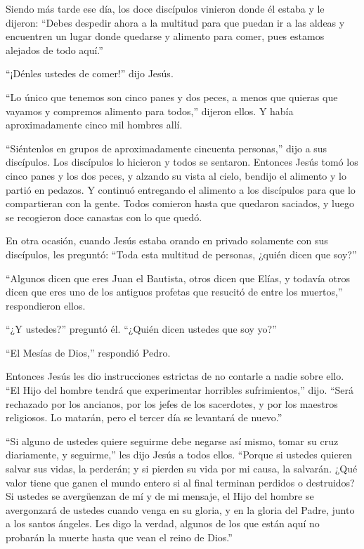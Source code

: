  Siendo más tarde ese día, los doce discípulos vinieron
donde él estaba y le dijeron: ``Debes despedir ahora a la multitud para
que puedan ir a las aldeas y encuentren un lugar donde quedarse y
alimento para comer, pues estamos alejados de todo aquí.''

 ``¡Dénles ustedes de comer!'' dijo Jesús.

``Lo único que tenemos son cinco panes y dos peces, a menos que quieras
que vayamos y compremos alimento para todos,'' dijeron ellos.
 Y había aproximadamente cinco mil hombres allí.

``Siéntenlos en grupos de aproximadamente cincuenta personas,'' dijo a
sus discípulos.  Los discípulos lo hicieron y todos se
sentaron.  Entonces Jesús tomó los cinco panes y los dos
peces, y alzando su vista al cielo, bendijo el alimento y lo partió en
pedazos. Y continuó entregando el alimento a los discípulos para que lo
compartieran con la gente.  Todos comieron hasta que
quedaron saciados, y luego se recogieron doce canastas con lo que quedó.

 En otra ocasión, cuando Jesús estaba orando en privado
solamente con sus discípulos, les preguntó: ``Toda esta multitud de
personas, ¿quién dicen que soy?''

 ``Algunos dicen que eres Juan el Bautista, otros dicen que
Elías, y todavía otros dicen que eres uno de los antiguos profetas que
resucitó de entre los muertos,'' respondieron ellos.

 ``¿Y ustedes?'' preguntó él. ``¿Quién dicen ustedes que
soy yo?''

``El Mesías de Dios,'' respondió Pedro.

 Entonces Jesús les dio instrucciones estrictas de no
contarle a nadie sobre ello.  ``El Hijo del hombre tendrá
que experimentar horribles sufrimientos,'' dijo. ``Será rechazado por
los ancianos, por los jefes de los sacerdotes, y por los maestros
religiosos. Lo matarán, pero el tercer día se levantará de nuevo.''

 ``Si alguno de ustedes quiere seguirme debe negarse así
mismo, tomar su cruz diariamente, y seguirme,'' les dijo Jesús a todos
ellos.  ``Porque si ustedes quieren salvar sus vidas, la
perderán; y si pierden su vida por mi causa, la salvarán. 
¿Qué valor tiene que ganen el mundo entero si al final terminan perdidos
o destruidos?  Si ustedes se avergüenzan de mí y de mi
mensaje, el Hijo del hombre se avergonzará de ustedes cuando venga en su
gloria, y en la gloria del Padre, junto a los santos ángeles.
 Les digo la verdad, algunos de los que están aquí no
probarán la muerte hasta que vean el reino de Dios.''


